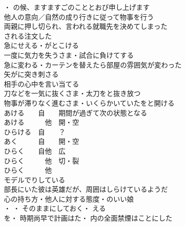 ・
の候、ますますごのこととおび申し上げます\\

他人の意向／自然の成り行きに従って物事を行う\\
両親に押し切られ、言われる就職先を決めてしまった\\
される注文した\\

急にせえる・がとこける\\
一度に気力を失うさま・試合に負けてする\\
急に変わる・カーテンを替えたら部屋の雰囲気が変わった\\
矢がに突き刺さる\\
相手の心中を言い当てる\\
刀などを一気に抜くさま・太刀をと抜き放つ\\
物事が滞りなく進むさま・いくらかいていたをと開ける\\

あける　　自　　期間が過ぎて次の状態となる\\
あける　　　他　開・空\\
ひらける　自　　？\\
あく　　　自　　開・空\\
ひらく　　自他　広\\
ひらく　　　他　切・裂\\
ひらく　　　他　\\

モデルでりしている\\
部長にいた彼は英雄だが、周囲はしらけているようだ\\
心の持ち方・他人に対する態度・のいい娘\\

・
・
そのままにしておく・
える　　\\
を・
時期尚早で計画はた・
内の全面禁煙はことにした\\

